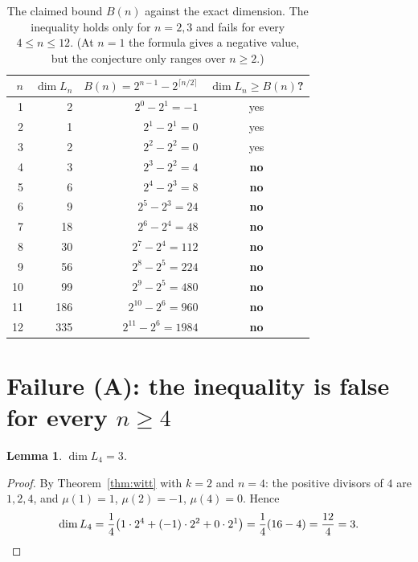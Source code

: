 \documentclass[11pt]{article}
\newtheorem{lemma}[theorem]{Lemma}
\theoremstyle{definition}
\theoremstyle{remark}
\begin{document}
\begin{table}[h]
\centering
\begin{tabular}{r|r|r|c}
$n$ & $\dim L_n$ & $B(n) = 2^{n-1} - 2^{\lceil n/2\rceil}$ & $\dim L_n \ge B(n)$? \\
\hline
1  & 2   & $2^{0}-2^{1} = -1$                    & yes \\
2  & 1   & $2^{1}-2^{1} = 0$                     & yes \\
3  & 2   & $2^{2}-2^{2} = 0$                     & yes \\
4  & 3   & $2^{3}-2^{2} = 4$                     & \textbf{no} \\
5  & 6   & $2^{4}-2^{3} = 8$                     & \textbf{no} \\
6  & 9   & $2^{5}-2^{3} = 24$                    & \textbf{no} \\
7  & 18  & $2^{6}-2^{4} = 48$                    & \textbf{no} \\
8  & 30  & $2^{7}-2^{4} = 112$                   & \textbf{no} \\
9  & 56  & $2^{8}-2^{5} = 224$                   & \textbf{no} \\
10 & 99  & $2^{9}-2^{5} = 480$                   & \textbf{no} \\
11 & 186 & $2^{10}-2^{6} = 960$                  & \textbf{no} \\
12 & 335 & $2^{11}-2^{6} = 1984$                 & \textbf{no} \\
\end{tabular}
\caption{The claimed bound $B(n)$ against the exact dimension. The inequality
holds only for $n = 2, 3$ and fails for every $4 \le n \le 12$. (At $n=1$ the
formula gives a negative value, but the conjecture only ranges over $n \ge 2$.)}
\label{tab:bound}
\end{table}

\section{Failure (A): the inequality is false for every $n \ge 4$}

\begin{lemma}
\label{lem:dim4}
$\dim L_4 = 3$.
\end{lemma}

\begin{proof}
By Theorem~\ref{thm:witt} with $k = 2$ and $n = 4$: the positive divisors of $4$
are $1,2,4$, and $\mu(1)=1$, $\mu(2)=-1$, $\mu(4)=0$. Hence
\[
\dim L_4 = \frac14\bigl(1\cdot 2^{4} + (-1)\cdot 2^{2} + 0\cdot 2^{1}\bigr)
= \frac14(16-4) = \frac{12}{4} = 3. \qedhere
\]
\end{proof}
\end{document}
